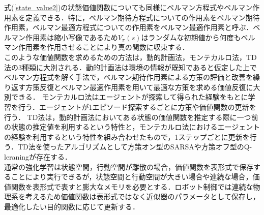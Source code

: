 \documentclass[dvipdfmx]{ampbt_nomag}
\begin{document}
式(\ref{state_value2})の状態価値関数についても同様にベルマン方程式やベルマン作用素を定義できる．特に，ベルマン期待方程式についての作用素をベルマン期待作用素，ベルマン最適方程式についての作用素をベルマン最適作用素と呼ぶ．ベルマン作用素は縮小写像であるため$V_\pi(s)$はランダムな初期値から何度もベルマン作用素を作用させることにより真の関数に収束する．\\
このような価値関数を求めるための方法は，動的計画法，モンテカルロ法，TD法の3種類に大別される．動的計画法は環境の情報が既知であると仮定した上でベルマン方程式を解く手法で，ベルマン期待作用素による方策の評価と改善を繰り返す方策反復とベルマン最適作用素を用いて最適な方策を求める価値反復に大別できる．
モンテカルロ法はエージェントが探索して得られた経験をもとに学習を行う．エージェントが1エピソード探索するごとに方策や価値関数の更新を行う．
TD法は，動的計画法においてある状態の価値関数を推定する際に一つ前の状態の推定値を利用するという特性と，モンテカルロ法におけるエージェントの経験を利用するという特性を組み合わせたもので，1ステップごとに更新を行う．TD法を使ったアルゴリズムとして方策オン型のSARSAや方策オフ型のQ-leraningが存在する．\\
通常の強化学習は状態空間，行動空間が離散の場合，価値関数を表形式で保存することにより実行できるが，状態空間と行動空間が大きい場合や連続な場合，価値関数を表形式で表すと膨大なメモリを必要とする．ロボット制御では連続な物理系を考えるため価値関数は表形式ではなく近似器のパラメータとして保存し，最適化したい目的関数に応じて更新する．
\end{document}
